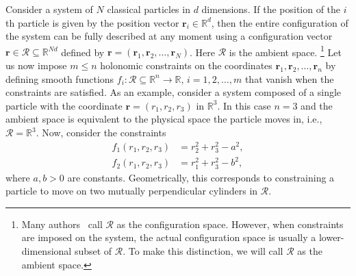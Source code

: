 Consider a system of $N$ classical particles in $d$ dimensions.  If the position of the $i$th particle is given by the position vector $\bm{r}_{i} \in \mathbb{R}^{d}$, then the entire configuration of the system can be fully described at any moment using a configuration vector $\bm{r} \in \mathscr{R} \subseteq \mathbb{R}^{Nd}$ defined by $\bm{r} = (\bm{r}_{1}, \bm{r}_{2}, \ldots, \bm{r}_{N})$.
  Here $\mathscr{R}$ is the ambient space.%
  \footnote{Many authors~\cite{littlejohn1997,lelievre2010} call $\mathscr{R}$ as the configuration space.  However, when constraints are imposed on the system, the actual configuration space is usually a lower-dimensional subset of $\mathscr{R}$.  To make this distinction, we will call $\mathscr{R}$ as the ambient space.}
Let us now impose $m \leq n$ holonomic constraints on the coordinates $\bm{r}_1, \bm{r}_2, \dots, \bm{r}_n$ by defining smooth functions $f_i: \mathscr{R} \subseteq \mathbb{R}^n \to \mathbb{R},\, i=1, 2, \dots, m$ that vanish when the constraints are satisfied.
As an example, consider a system composed of a single particle with the coordinate $\bm{r} = (r_{1}, r_{2}, r_{3})$ in $\mathbb{R}^3$.
In this case $n=3$ and the ambient space is equivalent to the physical space the particle moves in, i.e., $\mathscr{R} = \mathbb{R}^3$.
Now, consider the constraints
%
\begin{equation}
  \begin{aligned}
    f_1(r_{1}, r_{2}, r_{3}) &= r_{2}^{2} + r_{3}^{2} - a^{2},\\
    f_2(r_{1}, r_{2}, r_{3}) &= r_{1}^{2} + r_{3}^{2} - b^{2},
  \end{aligned}
  \label{eq:cylcyl}
\end{equation}
%
where $a, b > 0$ are constants.
Geometrically, this corresponds to constraining a particle to move on two mutually perpendicular cylinders in $\mathscr{R}$.

